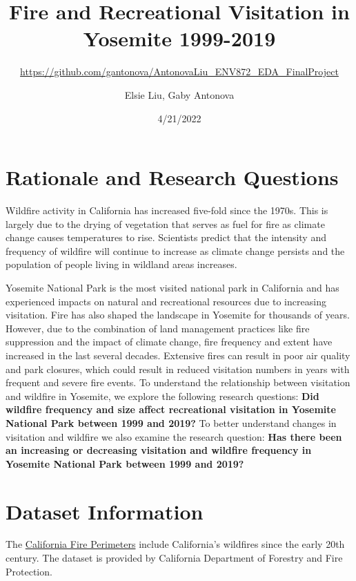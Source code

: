 \documentclass[
  12pt,
]{article}
\title{Fire and Recreational Visitation in Yosemite 1999-2019}
\subtitle{\url{https://github.com/gantonova/AntonovaLiu_ENV872_EDA_FinalProject}}
\author{Elsie Liu, Gaby Antonova}
\date{4/21/2022}
\begin{document}
\maketitle

{
\hypersetup{linkcolor=}
\setcounter{tocdepth}{2}
\tableofcontents
}
\newpage
\listoftables 
\newpage
\listoffigures 
\newpage

\hypertarget{rationale-and-research-questions}{%
\section{Rationale and Research Questions}\label{rationale-and-research-questions}}

Wildfire activity in California has increased five-fold since the 1970s. This is largely due to the drying of vegetation that serves as fuel for fire as climate change causes temperatures to rise. Scientists predict that the intensity and frequency of wildfire will continue to increase as climate change persists and the population of people living in wildland areas increases.

Yosemite National Park is the most visited national park in California and has experienced impacts on natural and recreational resources due to increasing visitation. Fire has also shaped the landscape in Yosemite for thousands of years. However, due to the combination of land management practices like fire suppression and the impact of climate change, fire frequency and extent have increased in the last several decades. Extensive fires can result in poor air quality and park closures, which could result in reduced visitation numbers in years with frequent and severe fire events. To understand the relationship between visitation and wildfire in Yosemite, we explore the following research questions: \textbf{Did wildfire frequency and size affect recreational visitation in Yosemite National Park between 1999 and 2019?} To better understand changes in visitation and wildfire we also examine the research question: \textbf{Has there been an increasing or decreasing visitation and wildfire frequency in Yosemite National Park between 1999 and 2019?}

\newpage

\hypertarget{dataset-information}{%
\section{Dataset Information}\label{dataset-information}}

The \href{https://gis.data.ca.gov/datasets/CALFIRE-Forestry::california-fire-perimeters-all/explore?location=37.260012\%2C-118.992700\%2C6.00\&showTable=true}{California Fire Perimeters} include California's wildfires since the early 20th century. The dataset is provided by California Department of Forestry and Fire Protection.
\end{document}
